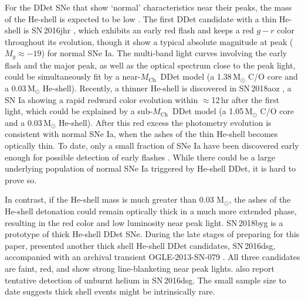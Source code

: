 \documentclass[twocolumn]{aastex631}
\newcommand{\Mch}{$M_\mathrm{Ch}$}
\begin{document}
For the DDet SNe that show `normal' characteristics near their peaks, the mass of the He-shell is expected to be low \citep[$\lesssim$0.03\,$\mathrm{M_\odot}$;][]{Kromer_DD_2010,Sim_2010,Shen_DD_2018,polin_observational_2019}. The first DDet candidate with a thin He-shell is SN\,2016jhr \citep{jiang_16jhr_2017}, which exhibits an early red flash and keeps a red $g-r$ color throughout its evolution, though it show a typical absolute magnitude at peak ($M_g\approx-19$) for normal SNe Ia. The multi-band light curves involving the early flash and the major peak, as well as the optical spectrum close to the peak light, could be simultaneously fit by a near-\Mch\ DDet model (a 1.38\,$\mathrm{M_\odot}$ C/O core and a 0.03\,$\mathrm{M_\odot}$ He-shell). Recently, a thinner He-shell is discovered in SN\,2018aoz \citep{Ni_2022}, a SN Ia showing a rapid redward color evolution within $\approx$12\,hr after the first light, which could be explained by a sub-\Mch\ DDet model (a 1.05\,$\mathrm{M_\odot}$ C/O core and a 0.03\,$\mathrm{M_\odot}$ He-shell). After this red excess the photometry evolution is consistent with normal SNe Ia, when the ashes of the thin He-shell becomes optically thin. To date, only a small fraction of SNe Ia have been discovered early enough for possible detection of early flashes \citep[e.g.,][]{Deckers_2022}. While there could be a large underlying population of normal SNe Ia triggered by He-shell DDet, it is hard to prove so.

In contrast, if the He-shell mass is much greater than 0.03\,$\,\mathrm{M_\odot}$, the ashes of the He-shell detonation could remain optically thick in a much more extended phase, resulting in the red color and low luminosity near peak light. SN\,2018byg \citep{de_18byg_2019} is a prototype of thick He-shell DDet SNe. During the late stages of preparing for this paper, \citet{Dong_16dsg_2022} presented another thick shell He-shell DDet candidates, SN\,2016dsg, accompanied with an archival transient OGLE-2013-SN-079 \citep{Inserra_OGLE13_079_2015}. All three candidates are faint, red, and show strong line-blanketing near peak lights. \citet{Dong_16dsg_2022} also report tentative detection of unburnt helium in SN\,2016dsg. The small sample size to date suggests thick shell events might be intrinsically rare.
\end{document}
